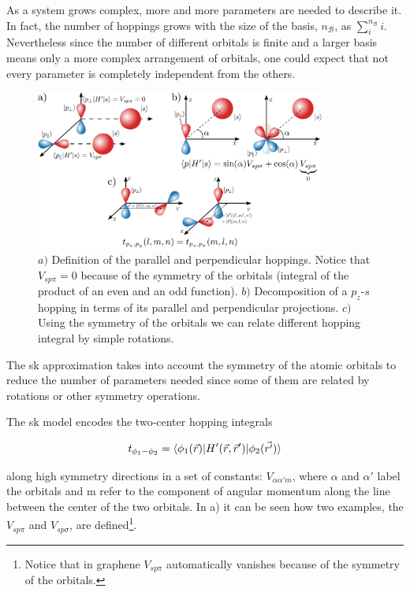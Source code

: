 As a system grows complex, more and more parameters are needed to describe it. In fact, the number of hoppings grows with the size of the basis, $n_\mathcal{B}$, as $\sum^{n_\mathcal{B}}_i i$. Nevertheless since the number of different orbitals is finite and a larger basis means only a more complex arrangement of orbitals, one could expect that not every parameter is completely independent from the others.
\begin{figure}[h!]
\centering
\includegraphics[width=0.85\textwidth]{graphene/figures/hoppings.pdf}
\vspace{-5pt}
\caption{$a)$ Definition of the parallel and perpendicular hoppings. Notice that $V_{sp\pi}=0$ because of the symmetry of the orbitals (integral of the product of an even and an odd function). $b)$ Decomposition of a $p_z$-$s$ hopping in terms of its parallel and perpendicular projections. $c)$ Using the symmetry of the orbitals we can relate different hopping integral by simple rotations.}
\label{fig:SK}
\end{figure}
\FloatBarrier
The \ac{sk} approximation\cite{Slater1954} takes into account the symmetry of the atomic orbitals to reduce the number of parameters needed since some of them are related by rotations or other symmetry operations.

The \ac{sk} model encodes the two-center hopping integrals\cite{Ashcroft1976, Grosso2000} 

$$t_{\phi_1-\phi_2} = \langle\phi_1(\vec{r})|H'(\vec{r},\vec{r}')|\phi_2(\vec{r'})\rangle$$

along high symmetry directions in a set of constants: $V_{\alpha\alpha'm}$, where $\alpha$ and $\alpha'$ label the orbitals and m refer to the component of angular momentum along the line between the center of the two orbitals. In a) it can be seen how two examples, the $V_{sp\pi}$ and $V_{sp\sigma}$, are defined\footnote{Notice that in graphene $V_{sp\pi}$ automatically vanishes because of the symmetry of the orbitals.}.


